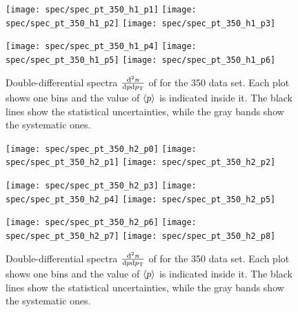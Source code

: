 \begin{figure}[!ht]
  \centering

  \texttt{[image: spec/spec\_pt\_350\_h1\_p1]}
  \texttt{[image: spec/spec\_pt\_350\_h1\_p2]}
  \texttt{[image: spec/spec\_pt\_350\_h1\_p3]}

  \texttt{[image: spec/spec\_pt\_350\_h1\_p4]}
  \texttt{[image: spec/spec\_pt\_350\_h1\_p5]}
  \texttt{[image: spec/spec\_pt\_350\_h1\_p6]}

  \caption{Double-differential spectra $\frac{\text{d}^2n}{\text{d}p\text{d}p_\text{T}}$
    of \antilamb for the 350 \GeVc data set. Each plot shows one \pp bins and the value
    of $\langle p\rangle$ is indicated inside it. The black lines show the statistical
    uncertainties, while the gray bands show the systematic ones.}
  \label{fig:hadron:spec:vzero:all350:h1}
\end{figure}


\begin{figure}[!ht]
  \centering

  \texttt{[image: spec/spec\_pt\_350\_h2\_p0]}
  \texttt{[image: spec/spec\_pt\_350\_h2\_p1]}
  \texttt{[image: spec/spec\_pt\_350\_h2\_p2]}
  
  \texttt{[image: spec/spec\_pt\_350\_h2\_p3]}
  \texttt{[image: spec/spec\_pt\_350\_h2\_p4]}
  \texttt{[image: spec/spec\_pt\_350\_h2\_p5]}

  \texttt{[image: spec/spec\_pt\_350\_h2\_p6]}
  \texttt{[image: spec/spec\_pt\_350\_h2\_p7]}
  \texttt{[image: spec/spec\_pt\_350\_h2\_p8]}

  \caption{Double-differential spectra $\frac{\text{d}^2n}{\text{d}p\text{d}p_\text{T}}$
    of \kzeros for the 350 \GeVc data set. Each plot shows one \pp bins and the value
    of $\langle p\rangle$ is indicated inside it. The black lines show the statistical
    uncertainties, while the gray bands show the systematic ones.}
  \label{fig:hadron:spec:vzero:all350:h2}
\end{figure}
